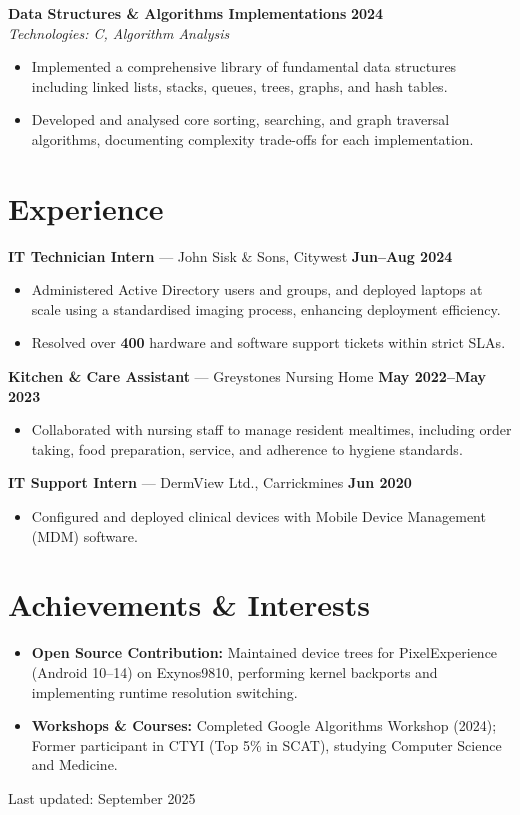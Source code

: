 \documentclass[10pt,a4paper]{article}
\begin{document}
\medskip
\textbf{Data Structures \& Algorithms Implementations} \hfill \textbf{2024} \\
\textit{Technologies: C, Algorithm Analysis}
\begin{itemize}
    \item Implemented a comprehensive library of fundamental data structures including linked lists, stacks, queues, trees, graphs, and hash tables.
    \item Developed and analysed core sorting, searching, and graph traversal algorithms, documenting complexity trade-offs for each implementation.
\end{itemize}


\section*{Experience}
\textbf{IT Technician Intern} --- John Sisk \& Sons, Citywest \hfill \textbf{Jun--Aug 2024}
\begin{itemize}
    \item Administered Active Directory users and groups, and deployed laptops at scale using a standardised imaging process, enhancing deployment efficiency.
    \item Resolved over \textbf{400} hardware and software support tickets within strict SLAs.
\end{itemize}
\medskip
\textbf{Kitchen \& Care Assistant} --- Greystones Nursing Home \hfill \textbf{May 2022--May 2023}
\begin{itemize}
    \item Collaborated with nursing staff to manage resident mealtimes, including order taking, food preparation, service, and adherence to hygiene standards.
\end{itemize}
\medskip
\textbf{IT Support Intern} --- DermView Ltd., Carrickmines \hfill \textbf{Jun 2020}
\begin{itemize}
    \item Configured and deployed clinical devices with Mobile Device Management (MDM) software.
\end{itemize}


\section*{Achievements \& Interests}
\begin{itemize}
    \item \textbf{Open Source Contribution:} Maintained device trees for PixelExperience (Android 10--14) on Exynos9810, performing kernel backports and implementing runtime resolution switching.
    \item \textbf{Workshops \& Courses:} Completed Google Algorithms Workshop (2024); Former participant in CTYI (Top 5\% in SCAT), studying Computer Science and Medicine.
\end{itemize}

\vfill
\begin{center}
    \small Last updated: September 2025
\end{center}
\end{document}
